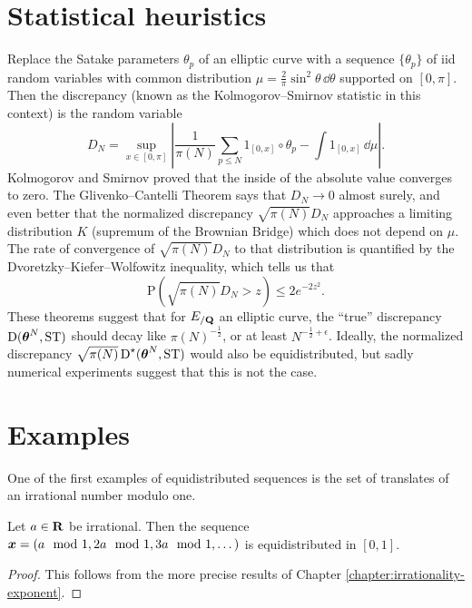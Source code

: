 \section{Statistical heuristics}

Replace the Satake parameters $\theta_p$ of an elliptic curve with 
a sequence $\{\theta_p\}$ of iid random variables with common distribution 
$\mu = \frac{2}{\pi} \sin^2 \theta\, \dd\theta$ supported on $[0,\pi]$. Then 
the discrepancy (known as the Kolmogorov--Smirnov statistic in this context) is 
the random variable 
\[
	D_N = \sup_{x\in [0,\pi]} \left|\frac{1}{\pi(N)} \sum_{p\leqslant N} 1_{[0,x]}\circ \theta_p - \int 1_{[0,x]}\, \dd\mu\right| .
\]
Kolmogorov and Smirnov proved that the inside of the absolute value converges 
to zero. The Glivenko--Cantelli Theorem says that $D_N \to 0$ almost surely, 
and even better that the normalized discrepancy $\sqrt{\pi(N)} D_N$ approaches 
a limiting distribution $K$ (supremum of the Brownian Bridge) which does not 
depend on $\mu$. The rate of convergence of $\sqrt{\pi(N)} D_N$ to that 
distribution is quantified by the Dvoretzky--Kiefer--Wolfowitz inequality, 
which tells us that 
\[
	\mathrm{P}\left(\sqrt{\pi(N)} D_N > z\right) \leqslant 2 e^{-2 z^2} .
\]
These theorems suggest that for $E_{/\mathbf{Q}}$ an elliptic 
curve, the ``true'' discrepancy $\operatorname{D}({\boldsymbol\theta}^N,\mathrm{ST})$ should decay 
like $\pi(N)^{-\frac 1 2}$, or at least $N^{-\frac 1 2+\epsilon}$. 
Ideally, the normalized discrepancy $\sqrt{\pi(N)}\operatorname{D}^\star({\boldsymbol\theta}^N,\mathrm{ST})$ 
would also be equidistributed, but sadly numerical experiments suggest that 
this is not the case. 





\section{Examples}

One of the first examples of equidistributed sequences is the set of translates  
of an irrational number modulo one. 

\begin{theorem}
Let $a\in \mathbf{R}$ be irrational. Then the sequence 
${\boldsymbol x}=(a\mod 1,2a\mod 1,3a\mod 1,\dots)$ is equidistributed in $[0,1]$. 
\end{theorem}
\begin{proof}
This follows from the more precise results of Chapter 
\ref{chapter:irrationality-exponent}. 
\end{proof}

